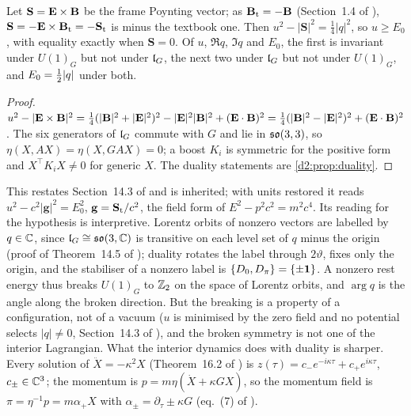 \begin{proposition}
\label{d2:prop:rest}
Let $\mathbf S=\mathbf E\times\mathbf B$ be the frame Poynting vector; as $\mathbf B_{\rm t}=-\mathbf B$ (Section~1.4 of \cite{ES17}), $\mathbf S=-\mathbf E\times\mathbf B_{\rm t}=-\mathbf S_{\rm t}$
is minus the textbook one. Then $u^2-|\mathbf S|^2=\tfrac14|q|^2$, so $u\ge E_0$, with equality exactly when $\mathbf S=0$. Of $u$, $\Re q$, $\Im q$ and
$E_0$, the first is invariant under $U(1)_G$ but not under $\mathfrak l_G$, the next two under $\mathfrak l_G$ but not under $U(1)_G$, and $E_0=\tfrac12|q|$ under both.
\end{proposition}

\begin{proof}
$u^2-|\mathbf E\times\mathbf B|^2=\tfrac14(|\mathbf B|^2+|\mathbf E|^2)^2-|\mathbf E|^2|\mathbf B|^2+(\mathbf E\cdot\mathbf B)^2=\tfrac14(|\mathbf B|^2-|\mathbf E|^2)^2+(\mathbf E\cdot\mathbf B)^2$. The six generators of $\mathfrak l_G$
commute with $G$ and lie in $\mathfrak{so}(3,3)$, so $\eta(X,AX)=\eta(X,GAX)=0$; a boost $K_i$ is symmetric for the positive form and $X^{\!\top}K_iX\neq0$ for
generic $X$. The duality statements are \cref{d2:prop:duality}.
\end{proof}

This restates Section~14.3 of \cite{ES17} and is inherited; with units restored it reads $u^2-c^2|\mathbf g|^2=E_0^2$, $\mathbf g=\mathbf S_{\rm t}/c^2$,
the field form of $E^2-p^2c^2=m^2c^4$. Its reading for the hypothesis is interpretive. Lorentz orbits of nonzero vectors are labelled by $q\in\mathbb{C}$,
since $\mathfrak l_G\cong\mathfrak{so}(3,\mathbb{C})$ is transitive on each level set of $q$ minus the origin (proof of Theorem~14.5 of \cite{ES17}); duality rotates the label
through $2\vartheta$, fixes only the origin, and the stabiliser of a nonzero label is $\{D_0,D_\pi\}=\{\pm\mathbf 1\}$. A nonzero rest energy thus breaks
$U(1)_G$ to $\mathbb{Z}_2$ on the space of Lorentz orbits, and $\arg q$ is the angle along the broken direction. But the breaking is a property of a
configuration, not of a vacuum ($u$ is minimised by the zero field and no potential selects $|q|\neq0$, Section~14.3 of \cite{ES17}), and the
broken symmetry is not one of the interior Lagrangian. What the interior dynamics does with duality is sharper. Every solution of
$\ddot X=-\kappa^2X$ (Theorem~16.2 of \cite{ES17}) is $z(\tau)=c_-e^{-i\kappa\tau}+c_+e^{i\kappa\tau}$, $c_\pm\in\mathbb{C}^3$; the momentum is
$p=m\eta(\dot X+\kappa GX)$, so the momentum field is $\pi=\eta^{-1}p=m\alpha_+X$ with $\alpha_\pm=\partial_\tau\pm\kappa G$ (eq.~(7) of \cite{ES17}).

